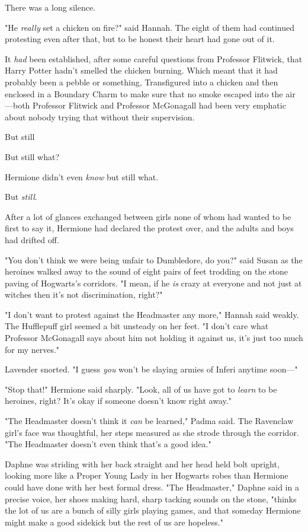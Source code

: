 There was a long silence.

"He \emph{really} set a chicken on fire?" said Hannah.
\sbreak
The eight of them had continued protesting even after that, but to be honest
their heart had gone out of it.

It \emph{had} been established, after some careful questions from Professor
Flitwick, that Harry Potter hadn't smelled the chicken burning. Which meant
that it had probably been a pebble or something, Transfigured into a chicken
and then enclosed in a Boundary Charm to make sure that no smoke escaped into
the air---both Professor Flitwick and Professor McGonagall had been very
emphatic about nobody trying that without their supervision.

But still{\el}

But still{\el} what?

Hermione didn't even \emph{know} but still what.

But \emph{still}.

After a lot of glances exchanged between girls none of whom had wanted to be
first to say it, Hermione had declared the protest over, and the adults and
boys had drifted off.

"You don't think we were being unfair to Dumbledore, do you?" said Susan as the
heroines walked away to the sound of eight pairs of feet trodding on the stone
paving of Hogwarts's corridors. "I mean, if he \emph{is} crazy at everyone and
not just at witches then it's not discrimination, right?"

"I don't want to protest against the Headmaster any more," Hannah said weakly.
The Hufflepuff girl seemed a bit unsteady on her feet. "I don't care what
Professor McGonagall says about him not holding it against us, it's just too
much for my nerves."

Lavender snorted. "I guess \emph{you} won't be slaying armies of Inferi anytime
soon\mbox{---}"

"Stop that!" Hermione said sharply. "Look, all of us have got to \emph{learn}
to be heroines, right? It's okay if someone doesn't know right away."

"The Headmaster doesn't think it \emph{can} be learned," Padma said. The
Ravenclaw girl's face was thoughtful, her steps measured as she strode through
the corridor. "The Headmaster doesn't even think that's a good idea."

Daphne was striding with her back straight and her head held bolt upright,
looking more like a Proper Young Lady in her Hogwarts robes than Hermione could
have done with her best formal dress. "The Headmaster," Daphne said in a
precise voice, her shoes making hard, sharp tacking sounds on the stone,
"thinks the lot of us are a bunch of silly girls playing games, and that
someday Hermione might make a good sidekick but the rest of us are hopeless."


